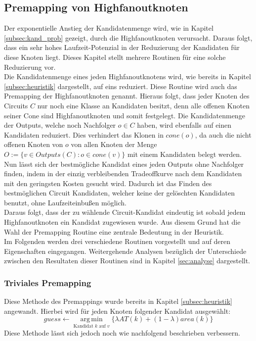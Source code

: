 \documentclass[11pt, a4paper, german]{article}
\DeclareMathOperator*{\argmin}{arg\,min}
\begin{document}
 \subsection{Premapping von Highfanoutknoten}
 \label{sec:premapping}
Der exponentielle Anstieg der Kandidatenmenge wird, wie in Kapitel \ref{subsec:kand_prob} gezeigt, durch die Highfanoutknoten verursacht. Daraus folgt, dass ein sehr hohes Laufzeit-Potenzial in der Reduzierung der Kandidaten für diese Knoten liegt. Dieses Kapitel stellt mehrere Routinen für eine solche Reduzierung vor.\\

 Die Kandidatenmenge eines jeden Highfanoutknotens wird, wie bereits in Kapitel \ref{subsec:heuristik} dargestellt, auf eins reduziert. Diese Routine wird auch das Premapping der Highfanoutknoten genannt. Hieraus folgt, dass jeder Knoten des Circuits $C$ nur noch eine Klasse an Kandidaten besitzt, denn alle offenen Knoten seiner Cone sind Highfanoutknoten und somit festgelegt.  Die Kandidatenmenge der Outputs, welche noch Nachfolger $o \in C$ haben, wird ebenfalls auf einen Kandidaten reduziert. Dies verhindert das Klonen in $cone(o)$, da  auch die nicht offenen Knoten von $o$ von allen Knoten der Menge $O := \{ v \in Outputs(C): o \in cone(v) \}$ mit einem Kandidaten belegt werden.\\
Nun lässt sich der bestmögliche Kandidat eines jeden Outputs ohne Nachfolger finden, indem in der einzig verbleibenden Tradeoffkurve nach dem Kandidaten mit den geringsten Kosten gesucht wird. Dadurch ist das Finden des  bestmöglichen Circuit Kandidaten,  welcher keine der gelöschten Kandidaten benutzt, ohne Laufzeiteinbußen möglich. \\
Daraus folgt, dass der zu wählende Circuit-Kandidat eindeutig ist sobald jedem Highfanoutknoten ein Kandidat zugewiesen wurde. Aus diesem Grund hat die Wahl der Premapping Routine eine zentrale Bedeutung in der Heuristik.\\

Im Folgenden werden drei verschiedene Routinen vorgestellt und auf deren Eigenschaften eingegangen. Weitergehende Analysen bezüglich der Unterschiede zwischen den Resultaten dieser Routinen sind in Kapitel \ref{sec:analyse} dargestellt.

\subsubsection{Triviales Premapping}
\label{subsec:triviales_premapping}
Diese Methode des Premappings wurde bereits in Kapitel \ref{subsec:heuristik} angewandt. Hierbei wird für jeden Knoten folgender Kandidat ausgewählt: \[ guess \gets \argmin\limits_{\text{Kandidat }k\text{ auf }v}\{ \lambda AT(k) + (1-\lambda) area(k)  \} \]
Diese Methode lässt sich jedoch noch wie nachfolgend beschrieben verbessern.\\
\end{document}
